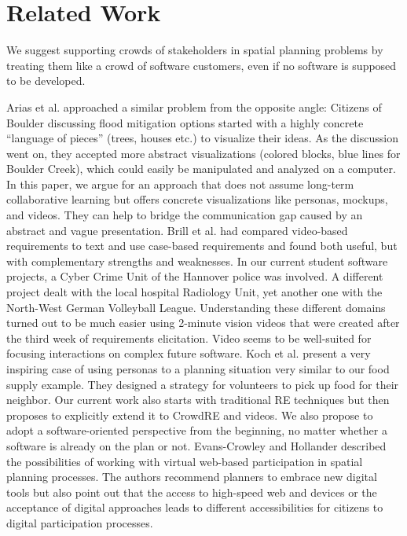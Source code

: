 \documentclass[conference]{IEEEtran}
\begin{document}
\section{Related Work}
\label{ch:5}
We suggest supporting crowds of stakeholders in spatial planning problems by 
treating them like a crowd of software customers, even if no software is 
supposed to be developed. 

Arias et al. \cite{Arias.1999, Arias.1998} approached a similar problem 
from the opposite angle: Citizens of Boulder discussing flood mitigation 
options started with a highly concrete ``language of pieces'' (trees, houses 
etc.) to visualize their ideas. As the discussion went on, they accepted more 
abstract visualizations (colored blocks, blue lines for Boulder Creek), which 
could easily be manipulated and analyzed on a computer. In this paper, we argue 
for an approach that does not assume long-term collaborative learning but 
offers concrete visualizations like personas, mockups, and videos. They can 
help to bridge the communication gap caused by an abstract and vague 
presentation.
Brill et al. \cite{Brill.2010} had compared video-based requirements to text 
and use case-based requirements and found both useful, but with complementary 
strengths and weaknesses. In our current student software projects, a Cyber 
Crime Unit of the Hannover police was involved. A different project dealt with 
the local hospital Radiology Unit, yet another one with the North-West German 
Volleyball League. Understanding these different domains turned out to be much 
easier using 2-minute vision videos that were created after the third week of 
requirements elicitation. Video seems to be well-suited for focusing 
interactions on complex future software. 
Koch et al. \cite{Koch.2016} present a very inspiring case of using personas 
to a planning situation very similar to our food supply example. They designed 
a strategy for volunteers to pick up food for their neighbor. Our current work 
also starts with traditional RE techniques but then proposes to explicitly 
extend it to CrowdRE and videos. We also propose to adopt a software-oriented 
perspective from the beginning, no matter whether a software is already on the 
plan or not.
Evans-Crowley and Hollander \cite{Evans.2010} described the possibilities of 
working with virtual web-based participation in spatial planning processes. The 
authors recommend planners to embrace new digital tools but also point out that 
the access to high-speed web and devices or the acceptance of digital 
approaches leads to different accessibilities for citizens to digital 
participation processes.
\end{document}
